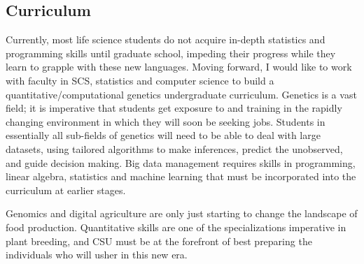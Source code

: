 \documentclass[11pt]{article}
\begin{document}
\subsection*{Curriculum}

Currently, most life science students do not acquire in-depth statistics and programming skills until graduate school, impeding their progress while they learn to grapple with these new languages. Moving forward, I would like to work with faculty in SCS, statistics and computer science to build a quantitative/computational genetics undergraduate curriculum. Genetics is a vast field; it is imperative that students get exposure to and training in the rapidly changing environment in which they will soon be seeking jobs. Students in essentially all sub-fields of genetics will need to be able to deal with large datasets, using tailored algorithms to make inferences, predict the unobserved, and guide decision making. Big data management requires skills in programming, linear algebra, statistics and machine learning that must be incorporated into the curriculum at earlier stages.


Genomics and digital agriculture are only just starting to change the landscape of food production. Quantitative skills are one of the specializations imperative in plant breeding, and CSU must be at the forefront of best preparing the individuals who will usher in this new era.
\end{document}
